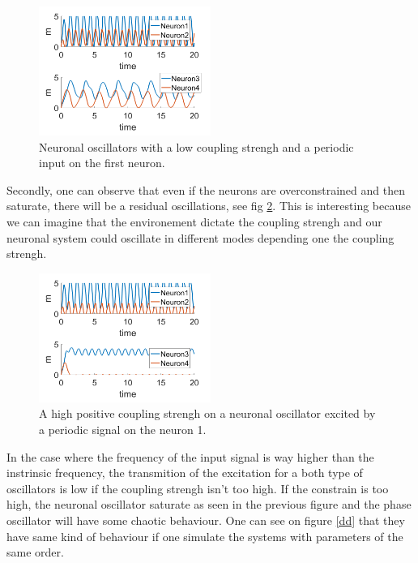\documentclass[a4paper]{scrartcl}
\begin{document}
\begin{figure}[!h]
	\centering
	\includegraphics[width=0.5\textwidth]{fig/7b.png}
	\caption{Neuronal oscillators with a low coupling strengh and a periodic input on the first neuron.}\label{7b}
\end{figure}

Secondly, one can observe that even if the neurons are overconstrained and then saturate, there will be a residual oscillations, see fig \ref{sat}. This is interesting because we can imagine that the environement dictate the coupling strengh and our neuronal system could oscillate in different modes depending one the coupling strengh.

\begin{figure}[!h]
	\centering
	\includegraphics[width=0.5\textwidth]{fig/sat.png}
	\caption{A high positive coupling strengh on a neuronal oscillator excited by a periodic signal on the neuron 1.}\label{sat}
\end{figure}

\newpage

In the case where the frequency of the input signal is way higher than the instrinsic frequency, the transmition of the excitation for a both type of oscillators is low if the coupling strengh isn't too high. If the constrain is too high, the neuronal oscillator saturate as seen in the previous figure and the phase oscillator will have some chaotic behaviour. One can see on figure \ref{dd} that they have same kind of behaviour if one simulate the systems with parameters of the same order.
\end{document}
